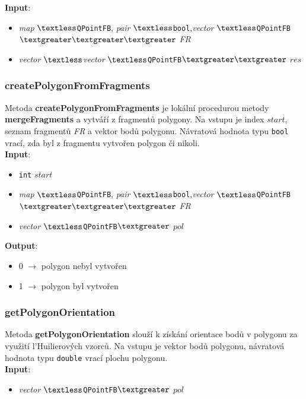 \documentclass[a4paper, 12pt]{article}
\begin{document}
\textbf{Input}:
\begin{itemize}
\item \textsl{map} $\textless$\texttt{QPointFB}, \textsl{pair} $\textless$\texttt{bool},\textsl{vector} $\textless$\texttt{QPointFB}$\textgreater \textgreater \textgreater$ \textit{FR}
\item \textsl{vector} $\textless$\textsl{vector} $\textless$\texttt{QPointFB}$\textgreater \textgreater$ $res$
\end{itemize}

\subsubsection*{createPolygonFromFragments}
Metoda \textbf{createPolygonFromFragments} je lokální procedurou metody \textbf{mergeFragments} a vytváří z fragmentů polygony. Na vstupu je index $start$, seznam fragmentů \textit{FR} a vektor bodů polygonu. Návratová hodnota typu \texttt{bool} vrací, zda byl z fragmentu vytvořen polygon či nikoli.\\

\textbf{Input}:
\begin{itemize}
\item \texttt{int} $start$ 
\item \textsl{map} $\textless$\texttt{QPointFB}, \textsl{pair} $\textless$\texttt{bool},\textsl{vector} $\textless$\texttt{QPointFB}$\textgreater \textgreater \textgreater$ \textit{FR}
\item \textsl{vector} $\textless$\texttt{QPointFB}$\textgreater$ $pol$
\end{itemize}

\textbf{Output}:
\begin{itemize}
\item 0 $\rightarrow$ polygon nebyl vytvořen 
\item 1 $\rightarrow$ polygon byl vytvořen 
\end{itemize}

\subsubsection*{getPolygonOrientation}
Metoda \textbf{getPolygonOrientation} slouží k získání orientace bodů v polygonu za využití l'Huilierových vzorců. Na vstupu je vektor bodů polygonu, návratová hodnota typu \texttt{double} vrací plochu polygonu.\\

\textbf{Input}:
\begin{itemize}
\item \textsl{vector} $\textless$\texttt{QPointFB}$\textgreater$ $pol$
\end{itemize}
\end{document}
